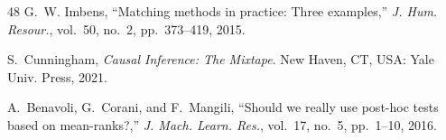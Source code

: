 \begin{thebibliography}{48}
G.~W. Imbens, ``Matching methods in practice: Three examples,'' \emph{J. Hum. Resour.}, vol.~50, no.~2, pp.~373--419, 2015.

S.~Cunningham, \emph{Causal Inference: The Mixtape}. New Haven, CT, USA: Yale Univ. Press, 2021.

A.~Benavoli, G.~Corani, and F.~Mangili, ``Should we really use post-hoc tests based on mean-ranks?,'' \emph{J. Mach. Learn. Res.}, vol.~17, no.~5, pp.~1--10, 2016.

\end{thebibliography}